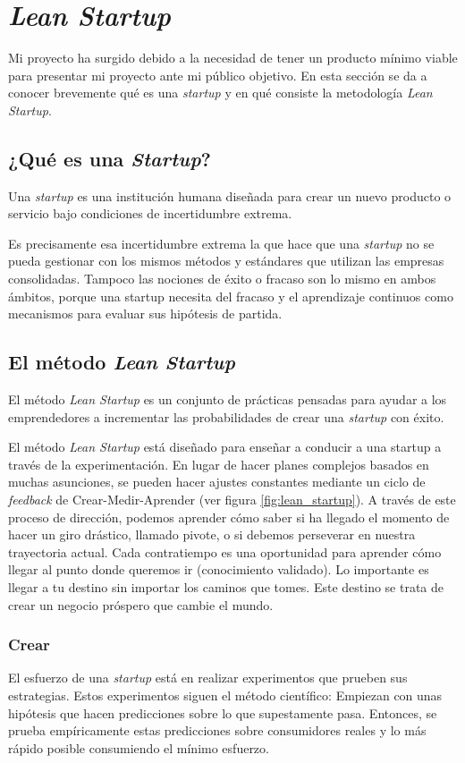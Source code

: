 \chapter{\textit{Lean Startup}}

Mi proyecto ha surgido debido a la necesidad de tener un producto mínimo viable para presentar mi proyecto ante mi público objetivo. En esta sección se da a conocer brevemente qué es una \textit{startup} y en qué consiste la metodología \textit{Lean Startup}. 

\section{¿Qué es una \textit{Startup}?}
Una \textit{startup} es una institución humana  diseñada para crear un nuevo producto o servicio bajo condiciones de incertidumbre extrema.


Es precisamente esa incertidumbre extrema la que hace que una \textit{startup} no se pueda gestionar con los mismos métodos y estándares que utilizan las empresas consolidadas. Tampoco las nociones de éxito o fracaso son lo mismo en ambos ámbitos, porque una startup necesita del fracaso y el aprendizaje continuos como mecanismos para evaluar sus hipótesis de partida.


\section{El método \textit{Lean Startup}}
El método \textit{Lean Startup} es un conjunto de prácticas pensadas para ayudar a los emprendedores a incrementar las probabilidades de crear una \textit{startup} con éxito. 


El método \textit{Lean Startup} está diseñado para enseñar a conducir a una startup a través de la experimentación. En lugar de hacer planes complejos basados en muchas asunciones, se pueden hacer ajustes constantes mediante un ciclo de \textit{feedback} de Crear-Medir-Aprender (ver figura \ref{fig:lean_startup}). A través de este proceso de dirección, podemos aprender cómo saber si ha llegado el momento de hacer un giro drástico, llamado pivote, o si debemos perseverar en nuestra trayectoria actual. Cada contratiempo es una oportunidad para aprender cómo llegar al punto donde queremos ir (conocimiento validado). Lo importante es llegar a tu destino sin importar los caminos que tomes. Este destino se trata de crear un negocio próspero que cambie el mundo.


\subsection{Crear}
El esfuerzo de una \textit{startup} está en realizar experimentos que prueben sus estrategias. Estos experimentos siguen el método científico: Empiezan con unas hipótesis que hacen predicciones sobre lo que supestamente pasa. Entonces, se prueba empíricamente estas predicciones sobre consumidores reales y lo más rápido posible consumiendo el mínimo esfuerzo.


